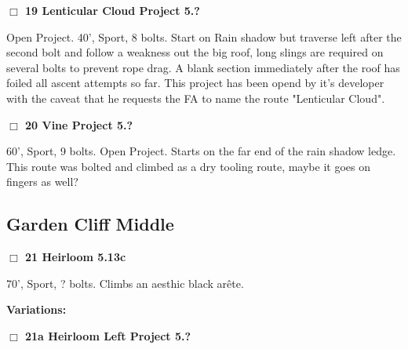 \begin{multicols}{2}
\needspace{2em}
\label{rt:Lenticular Cloud Project}
\colorbox{black!20}{
\parbox{0.95\linewidth}{
\hspace{-1ex}\textbf{$\Box$
19 Lenticular Cloud Project 5.?  
}}}
\begin{adjustwidth}{1.3em}{}			

Open Project. 40', Sport, 8 bolts. Start on Rain shadow but traverse left after the second bolt and follow a weakness out the big roof, long slings are required on several bolts to prevent rope drag. A blank section immediately after the roof has foiled all ascent attempts so far. This project has been opend by it's developer with the caveat that he requests the FA to name the route "Lenticular Cloud".
\end{adjustwidth}




\needspace{2em}
\label{rt:Vine Project}
\colorbox{black!20}{
\parbox{0.95\linewidth}{
\hspace{-1ex}\textbf{$\Box$
20 Vine Project 5.?  
}}}
\begin{adjustwidth}{1.3em}{}			

60', Sport, 9 bolts. Open Project. Starts on the far end of the rain shadow ledge. This route was bolted and climbed as a dry tooling route, maybe it goes on fingers as well?
\end{adjustwidth}







\needspace{10em}
\subsection*{Garden Cliff Middle}\label{bf:Garden Cliff Middle}




\needspace{2em}
\label{rt:Heirloom}
\colorbox{Goldenrod!20}{
\parbox{0.95\linewidth}{
\hspace{-1ex}\textbf{$\Box$
21 Heirloom 5.13c  
}}}
\begin{adjustwidth}{1.3em}{}			

70', Sport, ? bolts. Climbs an aesthic black arête.
\end{adjustwidth}


\begin{adjustwidth}{0.5cm}{}				
\needspace{4em}
\textbf{Variations:} \newline

\needspace{2em}
\label{vr:Heirloom Left Project}
\colorbox{black!20}{
\parbox{0.95\linewidth}{
\hspace{-1ex}\textbf{$\Box$
21a Heirloom Left Project 5.?  
}}}
\begin{adjustwidth}{1.3em}{}			


\end{adjustwidth}
\end{adjustwidth}
\end{multicols}
